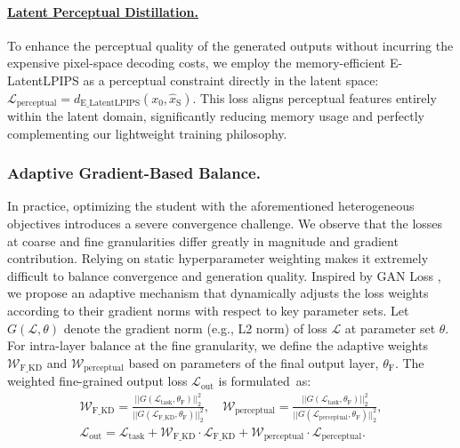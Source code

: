 \documentclass[runningheads]{llncs}
\begin{document}
\paragraph{\underline{Latent Perceptual Distillation.}} 
To enhance the perceptual quality of the generated outputs without incurring the expensive pixel-space decoding costs, we employ the memory-efficient E-LatentLPIPS \cite{kang2024diffusion2gan} as a perceptual constraint directly in the latent space: $\mathcal{L}_\mathrm{perceptual} =  d_\mathrm{E\_LatentLPIPS}(x_0, \hat{x}_\mathrm{S})$.
This loss aligns perceptual features entirely within the latent domain, significantly reducing memory usage and perfectly complementing our lightweight training philosophy.

\vspace{-0.5em}
\subsubsection{Adaptive Gradient-Based Balance.}
In practice, optimizing the student with the aforementioned heterogeneous objectives introduces a severe convergence challenge. We observe that the losses at coarse and fine granularities differ greatly in magnitude and gradient contribution. Relying on static hyperparameter weighting makes it extremely difficult to balance convergence and generation quality.
Inspired by GAN Loss \cite{esser2021VQGAN}, we propose an adaptive mechanism that dynamically adjusts the loss weights according to their gradient norms with respect to key parameter sets. Let $G(\mathcal{L},\theta)$ denote the gradient norm (e.g., L2 norm) of loss $\mathcal{L}$ at parameter set $\theta$.
For intra-layer balance at the fine granularity, we define the adaptive weights $\mathcal{W}_{\text{F\_KD}}$ and $\mathcal{W}_{\text{perceptual}}$ based on parameters of the final output layer, $\theta_\text{F}$. The weighted fine-grained output loss $\mathcal{L}_{\text{out}}$ is formulated~as:
\begin{equation}
\begin{gathered}
\mathcal{W}_{\text{F\_KD}} =  \frac{||G(\mathcal{L}_{\text{task}}, \theta_\text{F})||^2_2}{||G(\mathcal{L}_{\text{F\_KD}}, \theta_\text{F})||^2_2}, \quad
\mathcal{W}_{\text{perceptual}} =  \frac{||G(\mathcal{L}_{\text{task}}, \theta_\text{F})||^2_2}{||G(\mathcal{L}_{\text{perceptual}}, \theta_\text{F})||^2_2}, \\
\mathcal{L}_{\text{out}} = \mathcal{L}_{\text{task}} + \mathcal{W}_{\text{F\_KD}} \cdot \mathcal{L}_{\text{F\_KD}}  + \mathcal{W}_{\text{perceptual}} \cdot \mathcal{L}_{\text{perceptual}}.
\end{gathered}
\end{equation}
\end{document}
